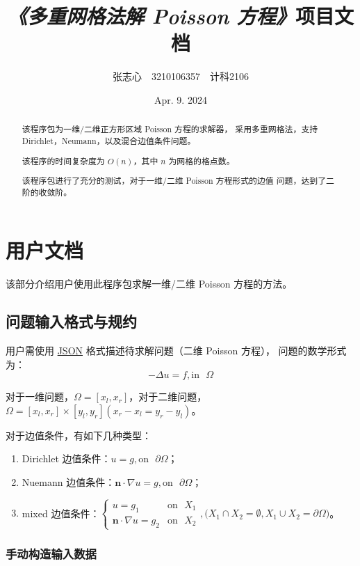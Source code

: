 \documentclass[lang=cn,a4paper,newtx,bibend=bibtex]{elegantpaper}
\title{\emph{《多重网格法解 Poisson 方程》}项目文档}
\author{张志心~~3210106357~~计科2106}
\date{Apr. 9. 2024}
\begin{document}
\maketitle

\tableofcontents
\newpage

\begin{abstract}

  该程序包为一维/二维正方形区域 Poisson 方程的求解器，
  采用多重网格法，支持 Dirichlet，Neumann，以及混合边值条件问题。
  
  该程序的时间复杂度为 $O(n)$，其中 $n$ 为网格的格点数。
  
  该程序包进行了充分的测试，对于一维/二维 Poisson 方程形式的边值
  问题，达到了二阶的收敛阶。
  
\end{abstract}

\section{用户文档}

该部分介绍用户使用此程序包求解一维/二维 Poisson 方程的方法。

\subsection{问题输入格式与规约}
用户需使用 \href{https://www.json.org/json-en.html}{JSON} 格式描述待求解问题（二维 Poisson 方程），
问题的数学形式为：
\[
    - \Delta u = f, \text{in~~} \Omega
\]

对于一维问题，$\Omega = [x_l, x_r]$，对于二维问题，
$\Omega = [x_l, x_r] \times [y_l, y_r] (x_r - x_l = y_r - y_l)$。

对于边值条件，有如下几种类型：
\begin{enumerate}
  \item Dirichlet 边值条件：$u = g, \text{on~~} \partial \Omega$；
  \item Nuemann 边值条件：$\bm{n} \cdot \nabla u = g, \text{on~~} \partial \Omega$；
  \item mixed 边值条件：$\begin{cases} u = g_1 & \text{on~~} X_1 \\ \bm{n} \cdot \nabla u = g_2 & \text{on~~} X_2\end{cases}, \bigg(X_1 \cap X_2 = \emptyset, X_1 \cup X_2 = \partial \Omega\bigg)$。
\end{enumerate}

\subsubsection{手动构造输入数据}
\end{document}
